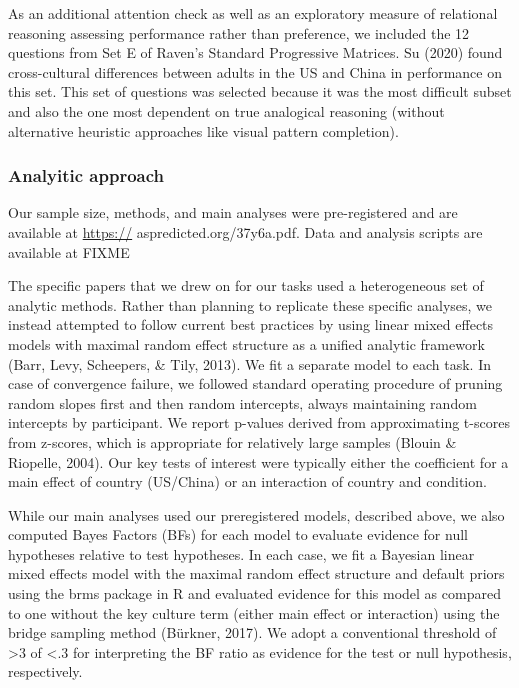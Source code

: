 \documentclass[
  man]{apa6}
\begin{document}
As an additional attention check as well as an exploratory measure of relational reasoning assessing performance rather than preference, we included the 12 questions from Set E of Raven's Standard Progressive Matrices. Su (2020) found cross-cultural differences between adults in the US and China in performance on this set. This set of questions was selected because it was the most difficult subset and also the one most dependent on true analogical reasoning (without alternative heuristic approaches like visual pattern completion).

\hypertarget{analyitic-approach}{%
\subsubsection{Analyitic approach}\label{analyitic-approach}}

Our sample size, methods, and main analyses were pre-registered and are available at \url{https://} aspredicted.org/37y6a.pdf. Data and analysis scripts are available at FIXME

The specific papers that we drew on for our tasks used a heterogeneous set of analytic methods. Rather than planning to replicate these specific analyses, we instead attempted to follow current best practices by using linear mixed effects models with maximal random effect structure as a unified analytic framework (Barr, Levy, Scheepers, \& Tily, 2013). We fit a separate model to each task. In case of convergence failure, we followed standard operating procedure of pruning random slopes first and then random intercepts, always maintaining random intercepts by participant. We report p-values derived from approximating t-scores from z-scores, which is appropriate for relatively large samples (Blouin \& Riopelle, 2004). Our key tests of interest were typically either the coefficient for a main effect of country (US/China) or an interaction of country and condition.

While our main analyses used our preregistered models, described above, we also computed Bayes Factors (BFs) for each model to evaluate evidence for null hypotheses relative to test hypotheses. In each case, we fit a Bayesian linear mixed effects model with the maximal random effect structure and default priors using the brms package in R and evaluated evidence for this model as compared to one without the key culture term (either main effect or interaction) using the bridge sampling method (Bürkner, 2017). We adopt a conventional threshold of \textgreater3 of \textless.3 for interpreting the BF ratio as evidence for the test or null hypothesis, respectively.
\end{document}
